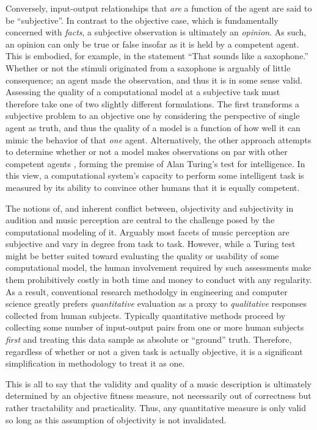 Conversely, input-output relationships that \emph{are} a function of the agent are said to be ``subjective''.
In contrast to the objective case, which is fundamentally concerned with \emph{facts}, a subjective observation is ultimately an \emph{opinion}.
As such, an opinion can only be true or false insofar as it is held by a competent agent.
This is embodied, for example, in the statement ``That sounds like a saxophone.''
Whether or not the stimuli originated from a saxophone is arguably of little consequence; an agent made the observation, and thus it is in some sense valid.
Assessing the quality of a computational model at a subjective task must therefore take one of two slightly different formulations.
The first transforms a subjective problem to an objective one by considering the perspective of single agent as truth, and thus the quality of a model is a function of how well it can mimic the behavior of that \emph{one} agent.
Alternatively, the other approach attempts to determine whether or not a model makes observations on par with other competent agents
, forming the premise of Alan Turing's test for intelligence.
In this view, a computational system's capacity to perform some intelligent task is measured by its ability to convince other humans that it is equally competent.

The notions of, and inherent conflict between, objectivity and subjectivity in audition and music perception are central to the challenge posed by the computational modeling of it.
Arguably most facets of music perception are subjective and vary in degree from task to task.
However, while a Turing test might be better suited toward evaluating the quality or usability of some computational model, the human involvement required by such assessments make them prohibitively costly in both time and money to conduct with any regularity.
As a result, conventional research methodolgy in engineering and computer science greatly prefers \emph{quantitative} evaluation as a proxy to \emph{qualitative} responses collected from human subjects.
Typically quantitative methods proceed by collecting some number of input-output pairs from one or more human subjects \emph{first} and treating this data sample as absolute or ``ground'' truth.
Therefore, regardless of whether or not a given task is actually objective, it is a significant simplification in methodology to treat it as one.

This is all to say that the validity and quality of a music description is ultimately determined by an objective fitness measure, not necessarily out of correctness but rather tractability and practicality.
Thus, any quantitative measure is only valid so long as this assumption of objectivity is not invalidated.


